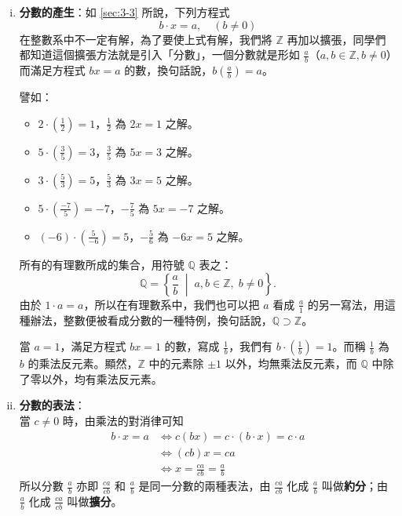 \begin{enumerate}[(i)]
  \item \textbf{分數的產生}：如 \ref{sec:3-3} 所說，下列方程式
  \begin{equation*}
    b \cdot x = a, \quad (b \neq 0)
  \end{equation*}
  在整數系中不一定有解，為了要使上式有解，我們將 $\mathbb{Z}$ 再加以擴張，同學們都知道這個擴張方法就是引入「分數」，一個分數就是形如 $\frac{a}{b}$（$a, b \in \mathbb{Z}, b \neq 0$）而滿足方程式 $bx=a$ 的數，換句話說，$b\left(\frac{a}{b}\right) = a$。

  譬如：
  \begin{itemize}
    \item $2 \cdot \left(\frac{1}{2}\right) = 1$，$\frac{1}{2}$ 為 $2x=1$ 之解。
    \item $5 \cdot \left(\frac{3}{5}\right) = 3$，$\frac{3}{5}$ 為 $5x=3$ 之解。
    \item $3 \cdot \left(\frac{5}{3}\right) = 5$，$\frac{5}{3}$ 為 $3x=5$ 之解。
    \item $5 \cdot \left(\frac{-7}{5}\right) = -7$，$-\frac{7}{5}$ 為 $5x=-7$ 之解。
    \item $(-6) \cdot \left(\frac{5}{-6}\right) = 5$，$-\frac{5}{6}$ 為 $-6x=5$ 之解。
  \end{itemize}
  所有的有理數所成的集合，用符號 $\mathbb{Q}$ 表之：
  \begin{equation*}
    \mathbb{Q} = \left\{\frac{a}{b} \;\middle|\; a, b \in \mathbb{Z}, \; b \neq 0\right\}.
  \end{equation*}
  由於 $1 \cdot a = a$，所以在有理數系中，我們也可以把 $a$ 看成 $\frac{a}{1}$ 的另一寫法，用這種辦法，整數便被看成分數的一種特例，換句話說，$\mathbb{Q} \supset \mathbb{Z}$。

  當 $a=1$，滿足方程式 $bx=1$ 的數，寫成 $\frac{1}{b}$，我們有 $b \cdot \left(\frac{1}{b}\right) = 1$。而稱 $\frac{1}{b}$ 為 $b$ 的乘法反元素。顯然，$\mathbb{Z}$ 中的元素除 $\pm 1$ 以外，均無乘法反元素，而 $\mathbb{Q}$ 中除了零以外，均有乘法反元素。

  \item \textbf{分數的表法}：\\
  當 $c \neq 0$ 時，由乘法的對消律可知
  \begin{align*}
    b \cdot x = a &\iff c(bx) = c \cdot (b \cdot x) = c \cdot a \\
    &\iff (cb)x = ca \\
    &\iff x = \frac{ca}{cb} = \frac{a}{b}
  \end{align*}
  所以分數 $\frac{a}{b}$ 亦即 $\frac{ca}{cb}$ 和 $\frac{a}{b}$ 是同一分數的兩種表法，由 $\frac{ca}{cb}$ 化成 $\frac{a}{b}$ 叫做\textbf{約分}；由 $\frac{a}{b}$ 化成 $\frac{ca}{cb}$ 叫做\textbf{擴分}。


\end{enumerate}
